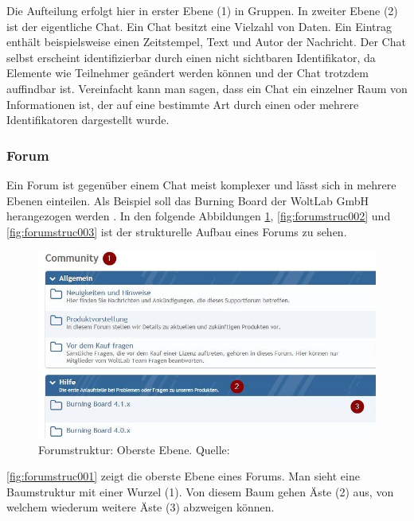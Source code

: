 \documentclass[a4paper]{article}
\begin{document}
	Die Aufteilung erfolgt hier in erster Ebene (1) in Gruppen. In zweiter Ebene (2)
	ist der eigentliche Chat. Ein Chat besitzt eine Vielzahl von Daten. Ein
	Eintrag enthält beispielsweise einen Zeitstempel, Text und Autor der
	Nachricht. Der Chat selbst erscheint identifizierbar durch einen nicht
	sichtbaren Identifikator, da Elemente wie Teilnehmer geändert werden können
	und der Chat trotzdem auffindbar ist. Vereinfacht kann man sagen, dass ein
	Chat ein einzelner Raum von Informationen ist, der auf eine bestimmte Art
	durch einen oder mehrere Identifikatoren dargestellt wurde.
	
	\subsubsection{Forum}	
	
	Ein Forum ist gegenüber einem Chat meist komplexer und lässt sich in mehrere
	Ebenen einteilen. Als Beispiel soll das	Burning Board der WoltLab GmbH
	herangezogen werden \cite{BB}. In den folgende Abbildungen
	\ref{fig:forumstruc001}, \ref{fig:forumstruc002} und \ref{fig:forumstruc003}
	ist der strukturelle Aufbau eines Forums zu sehen.
	
	\begin{figure}[H] 
		\centerline{
			\includegraphics[scale=0.65]{../Bilder/forumstruc001.jpg}
		}
		\caption{Forumstruktur: Oberste Ebene. Quelle: \cite{BB}}
		\label{fig:forumstruc001}
	\end{figure}	
	
	\newpage
	\autoref{fig:forumstruc001} zeigt die oberste Ebene eines Forums. Man sieht
	eine Baumstruktur mit einer Wurzel (1). Von diesem Baum gehen Äste (2) aus,
	von welchem wiederum weitere Äste (3) abzweigen können.
	
\end{document}
